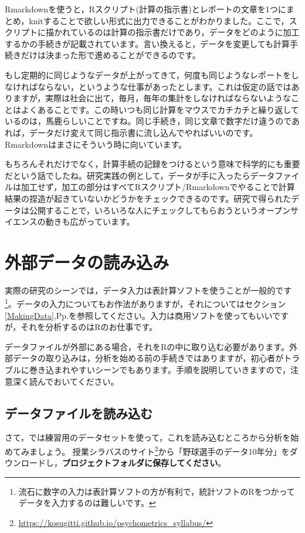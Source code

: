 \documentclass{ltjsbook}
\begin{document}
Rmarkdownを使うと，Rスクリプト(計算の指示書)とレポートの文章を1つにまとめ，knitすることで欲しい形式に出力できることがわかりました。ここで，スクリプトに描かれているのは計算の指示書だけであり，データをどのように加工するかの手続きが記載されています。言い換えると，データを変更しても計算手続きだけは決まった形で進めることができるのです。

もし定期的に同じようなデータが上がってきて，何度も同じようなレポートをしなければならない，というような仕事があったとします。これは仮定の話ではありますが，実際は社会に出て，毎月，毎年の集計をしなければならないようなことはよくあることです。この時いつも同じ計算をマウスでカチカチと繰り返しているのは，馬鹿らしいことですね。同じ手続き，同じ文章で数字だけ違うのであれば，データだけ変えて同じ指示書に流し込んでやればいいのです。Rmarkdownはまさにそういう時に向いています。

もちろんそれだけでなく，計算手続の記録をつけるという意味で科学的にも重要だという話でしたね。研究実践の例として，データが手に入ったらデータファイルは加工せず，加工の部分はすべてRスクリプト/Rmarkdownでやることで計算結果の捏造が起きていないかどうかをチェックできるのです。研究で得られたデータは公開することで，いろいろな人にチェックしてもらおうというオープンサイエンスの動きも広がっています。

\section{外部データの読み込み}
実際の研究のシーンでは，データ入力は表計算ソフトを使うことが一般的です\footnote{流石に数字の入力は表計算ソフトの方が有利で，統計ソフトのRをつかってデータを入力するのは難しいです。}。データの入力についてもお作法がありますが，それについてはセクション\ref{MakingData},Pp.\pageref{MakingData}を参照してください。入力は商用ソフトを使ってもいいですが，それを分析するのはRのお仕事です。

データファイルが外部にある場合，それをRの中に取り込む必要があります。外部データの取り込みは，分析を始める前の手続きではありますが，初心者がトラブルに巻き込まれやすいシーンでもあります。手順を説明していきますので，注意深く読んでおいてください。

\subsection{データファイルを読み込む}
\label{readCSV}
さて，では練習用のデータセットを使って，これを読み込むところから分析を始めてみましょう。
授業シラバスのサイト\footnote{\url{https://kosugitti.github.io/psychometrics_syllabus/}}から「野球選手のデータ10年分」をダウンロードし，\textbf{プロジェクトフォルダに保存してください}。
\end{document}
